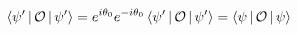 \documentclass[preview]{standalone}
\begin{document}
\begin{align*}
\Braket{\psi '|\mathcal{O}|\psi '} = e^{i \theta_0}e^{-i \theta_0}\Braket{\psi ' |\mathcal{O}|\psi '} = \Braket{\psi|\mathcal{O}|\psi}
\end{align*}
\end{document}
